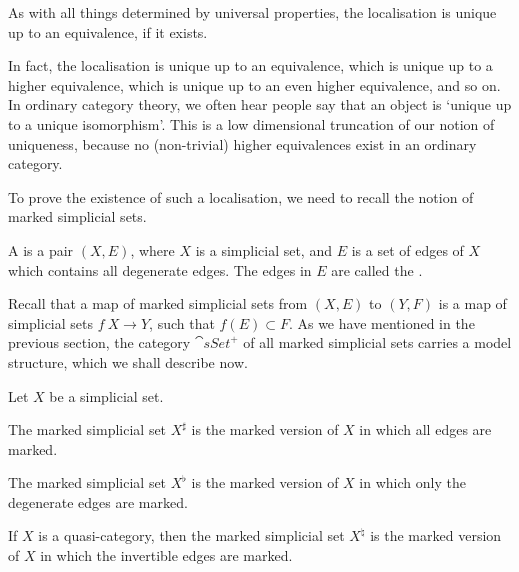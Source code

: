 As with all things determined by universal properties,
the localisation is unique up to an equivalence, if it exists.

\begin{remark}
    In fact, the localisation is unique up to an equivalence,
    which is unique up to a higher equivalence,
    which is unique up to an even higher equivalence, and so on. 
    In ordinary category theory, we often hear people say that 
    an object is `unique up to a unique isomorphism'.
    This is a low dimensional truncation of our notion of uniqueness,
    because no (non-trivial) higher equivalences exist in an ordinary category. \varqed
\end{remark}

To prove the existence of such a localisation,
we need to recall the notion of marked simplicial sets.

\begin{definition}
    A  is a pair $(X,E)$,
    where $X$ is a simplicial set,
    and $E$ is a set of edges of $X$ which contains all degenerate edges.
    The edges in $E$ are called the .
\end{definition}

Recall that a map of marked simplicial sets from $(X,E)$ to $(Y,F)$
is a map of simplicial sets $f\:X\to Y$, such that $f(E)\subset F$.
As we have mentioned in the previous section,
the category $\cat{sSet}^+$ of all marked simplicial sets 
carries a model structure, which we shall describe now.

\begin{definition}
    Let $X$ be a simplicial set.
    \begin{itms}
        \item The marked simplicial set $X^\sharp$
        is the marked version of $X$ in which all edges are marked.
        \item The marked simplicial set $X^\flat$
        is the marked version of $X$ in which only the degenerate edges are marked.
        \item If $X$ is a quasi-category, then the marked simplicial set $X^\natural$
        is the marked version of $X$ in which the invertible edges are marked.
    \end{itms}
\end{definition}

